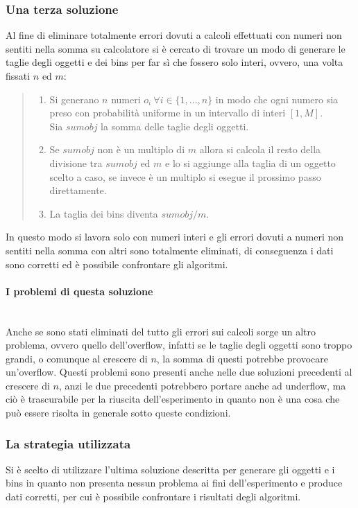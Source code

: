 \subsubsection{Una terza soluzione}
Al fine di eliminare totalmente errori dovuti a calcoli effettuati con numeri non sentiti nella somma su calcolatore 
si è cercato di trovare un modo di generare le taglie degli oggetti e dei bins per far sì che fossero solo interi, ovvero, una volta fissati 
$ n $ ed $ m $:
\begin{quote}
	\begin{enumerate}
		\item Si generano $ n $ numeri $ o_i \: \forall i \in \{1, ..., n\} $ in modo che ogni numero sia preso con probabilità
			  uniforme in un intervallo di interi $ [1, M] $.\\
			  Sia $ sumobj $ la somma delle taglie degli oggetti.
		\item Se $ sumobj $  non è un multiplo di $ m $ allora si calcola il resto 
			  della divisione tra $ sumobj $ ed $ m $ e lo si aggiunge alla taglia di un oggetto scelto a caso, se invece è un multiplo 
			  si esegue il prossimo passo direttamente.
		\item La taglia dei bins diventa $ sumobj/m $.
	\end{enumerate}
\end{quote}
In questo modo si lavora solo con numeri interi e gli errori dovuti a numeri non sentiti nella somma con altri sono totalmente
eliminati, di conseguenza i dati sono corretti ed è possibile confrontare gli algoritmi.

\paragraph{I problemi di questa soluzione}\mbox{}\\
Anche se sono stati eliminati del tutto gli errori sui calcoli sorge un altro problema, ovvero quello dell'overflow, infatti se le taglie
degli oggetti sono troppo grandi, o comunque al crescere di $ n $, la somma di questi potrebbe provocare un'overflow. Questi problemi sono
presenti anche nelle due soluzioni precedenti al crescere di $ n $, anzi le due precedenti potrebbero portare anche ad underflow, ma ciò è trascurabile per
la riuscita dell'esperimento in quanto non è una cosa che può essere risolta in generale sotto queste condizioni.


\subsubsection{La strategia utilizzata}
Si è scelto di utilizzare l'ultima soluzione descritta per generare gli oggetti e i bins in quanto non presenta nessun problema ai fini
dell'esperimento e produce dati corretti, per cui è possibile confrontare i risultati degli algoritmi.


